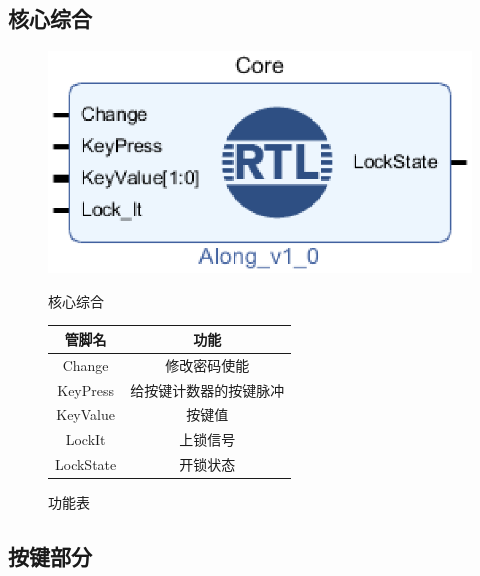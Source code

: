 \documentclass[a4paper,11pt]{ctexart}
\begin{document}
\subsection{核心综合}
\begin{figure}[htb]
  \begin{minipage}[b]{0.5\textwidth}
    \centering
    \includegraphics[width = \textwidth]{./images/AlongCore.eps}
    \caption{核心综合}
    \label{fig:by:table}
  \end{minipage}%
  \begin{minipage}[b]{0.5\textwidth}
    \centering
    \begin{tabular}{|c|c|} \hline
      管脚名 & 功能 \\ \hline\hline
      Change        &   修改密码使能                       \\
      KeyPress      &   给按键计数器的按键脉冲  \\
      KeyValue      &   按键值                                    \\
      LockIt       &   上锁信号                                \\
      LockState     &   开锁状态                                \\ \hline
    \end{tabular}
    \caption{功能表}
    \label{table:by:fig}
  \end{minipage}
\end{figure}


\subsection{按键部分}
\end{document}
